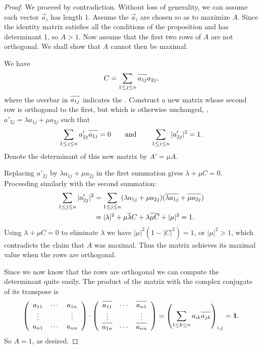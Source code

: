 \begin{proof} 
We proceed by contradiction.
Without loss of generality, we can assume each vector $\vec{a}_i$  has
length $1$.  Assume the $\vec{a}_i$ are chosen so as to 
maximize $A$.  Since the identity matrix satisfies all the conditions
of the proposition and has determinant $1$, so
$A > 1$.  Now assume that the first two rows of $A$ are not
orthogonal.  We shall show that $A$ cannot then be maximal.

We have
\[
C = \sum_{1 \le j \le n}\overline{\vphantom{b}a_{1j}} a_{2j},
\]
where the overbar in $\overline{\vphantom{b}a_{1j}}$ indicates the
. 
Construct a new matrix whose second row is orthogonal to the first,
but which is otherwise unchanged, \ie, $a'_{2j} = \lambda a_{1j} + \mu
a_{2j}$ such that
\[
\sum_{1 \le j \le n} a'_{2j} \overline{\vphantom{b}a_{1j}} = 0
\qquad\mbox{and}\qquad
\sum_{1 \le j \le n} |a'_{2j}|^2 = 1.
\]
Denote the determinant of this new matrix by $A' = \mu A$.

Replacing $a'_{2j}$ by $\lambda a_{1j} + \mu a_{2j}$ in the first
summation gives $\lambda + \mu C = 0$.  Proceeding similarly with the
second summation:
\[
\begin{aligned}
\sum_{1 \le j \le n} |a'_{2j}|^2  & = 
\sum_{1 \le j \le n} (\lambda a_{1j} + \mu a_{2j}) 
  (\overline{\lambda} \overline{\vphantom{b}a_{1j}} + \overline{\vphantom{b}\mu}
\overline{\vphantom{b}a_{2j}})  \\
  & = |\lambda|^2 + \mu \overline{\lambda} C 
        + \lambda \overline{\vphantom{b}\mu}\overline{C} + |\mu|^2 = 1.
\end{aligned}
\]
Using $\lambda + \mu C = 0$ to eliminate $\lambda$ we have 
$|\mu|^2 ( 1 - |C|^2) = 1$, or $|\mu|^2 > 1$, which contradicts the
claim that $A$ was maximal.  Thus the matrix achieves its maximal
value when the rows are orthogonal.

Since we now know that the rows are orthogonal we can compute the
determinant quite easily.  The product of the matrix with the complex
conjugate of its transpose is
\[
\left(
 \begin{array}{cccc}
a_{11} & \cdots & a_{1n} \\
\vdots &  & \vdots \\
a_{n1} & \cdots & a_{nn} 
\end{array}
\right)
\cdot
\left(
 \begin{array}{cccc}
\overline{\vphantom{b}a_{11}} & \cdots & \overline{\vphantom{b}a_{n1}} \\
\vdots &  & \vdots \\
\overline{\vphantom{b}a_{1n}} & \cdots & \overline{\vphantom{b}a_{nn}} 
\end{array}
\right) =
\left(\sum_{1 \le k \le n} a_{ik} \overline{\vphantom{b}a_{jk}}\right)_{i,j}
= {\bf 1}.
\]
So $A = 1$, as desired.
\end{proof}


